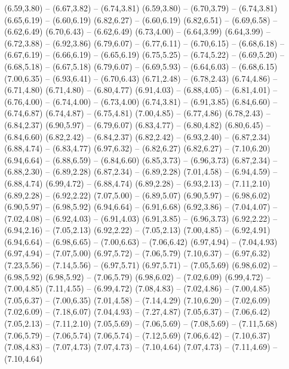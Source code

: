 {  (6.59,3.80) -- (6.67,3.82) -- (6.74,3.81)
  (6.59,3.80) -- (6.70,3.79) -- (6.74,3.81)
  (6.65,6.19) -- (6.60,6.19)
  (6.82,6.27) -- (6.60,6.19)
  (6.82,6.51) -- (6.69,6.58) -- (6.62,6.49)
  (6.70,6.43) -- (6.62,6.49)
  (6.73,4.00) -- (6.64,3.99)
  (6.64,3.99) -- (6.72,3.88) -- (6.92,3.86)
  (6.79,6.07) -- (6.77,6.11) -- (6.70,6.15) -- (6.68,6.18) -- (6.67,6.19) -- (6.66,6.19) -- (6.65,6.19)
  (6.75,5.25) -- (6.74,5.22) -- (6.69,5.20) -- (6.68,5.18) -- (6.67,5.18)
  (6.79,6.07) -- (6.69,5.93) -- (6.64,6.03) -- (6.68,6.15)
  (7.00,6.35) -- (6.93,6.41) -- (6.70,6.43)
  (6.71,2.48) -- (6.78,2.43)
  (6.74,4.86) -- (6.71,4.80)
  (6.71,4.80) -- (6.80,4.77)
  (6.91,4.03) -- (6.88,4.05) -- (6.81,4.01) -- (6.76,4.00) -- (6.74,4.00) -- (6.73,4.00)
  (6.74,3.81) -- (6.91,3.85)
  (6.84,6.60) -- (6.74,6.87)
  (6.74,4.87) -- (6.75,4.81)
  (7.00,4.85) -- (6.77,4.86)
  (6.78,2.43) -- (6.84,2.37)
  (6.90,5.97) -- (6.79,6.07)
  (6.83,4.77) -- (6.80,4.82)
  (6.80,6.45) -- (6.84,6.60)
  (6.82,2.42) -- (6.84,2.37)
  (6.82,2.42) -- (6.93,2.40) -- (6.87,2.34)
  (6.88,4.74) -- (6.83,4.77)
  (6.97,6.32) -- (6.82,6.27)
  (6.82,6.27) -- (7.10,6.20)
  (6.94,6.64) -- (6.88,6.59) -- (6.84,6.60)
  (6.85,3.73) -- (6.96,3.73)
  (6.87,2.34) -- (6.88,2.30) -- (6.89,2.28)
  (6.87,2.34) -- (6.89,2.28)
  (7.01,4.58) -- (6.94,4.59) -- (6.88,4.74)
  (6.99,4.72) -- (6.88,4.74)
  (6.89,2.28) -- (6.93,2.13) -- (7.11,2.10)
  (6.89,2.28) -- (6.92,2.22)
  (7.07,5.00) -- (6.89,5.07)
  (6.90,5.97) -- (6.98,6.02)
  (6.90,5.97) -- (6.98,5.92)
  (6.94,6.64) -- (6.91,6.68)
  (6.92,3.86) -- (7.04,4.07) -- (7.02,4.08) -- (6.92,4.03) -- (6.91,4.03)
  (6.91,3.85) -- (6.96,3.73)
  (6.92,2.22) -- (6.94,2.16) -- (7.05,2.13)
  (6.92,2.22) -- (7.05,2.13)
  (7.00,4.85) -- (6.92,4.91)
  (6.94,6.64) -- (6.98,6.65) -- (7.00,6.63) -- (7.06,6.42)
  (6.97,4.94) -- (7.04,4.93)
  (6.97,4.94) -- (7.07,5.00)
  (6.97,5.72) -- (7.06,5.79)
  (7.10,6.37) -- (6.97,6.32)
  (7.23,5.56) -- (7.14,5.56) -- (6.97,5.71)
  (6.97,5.71) -- (7.05,5.69)
  (6.98,6.02) -- (6.98,5.92)
  (6.98,5.92) -- (7.06,5.79)
  (6.98,6.02) -- (7.02,6.09)
  (6.99,4.72) -- (7.00,4.85)
  (7.11,4.55) -- (6.99,4.72)
  (7.08,4.83) -- (7.02,4.86) -- (7.00,4.85)
  (7.05,6.37) -- (7.00,6.35)
  (7.01,4.58) -- (7.14,4.29)
  (7.10,6.20) -- (7.02,6.09)
  (7.02,6.09) -- (7.18,6.07)
  (7.04,4.93) -- (7.27,4.87)
  (7.05,6.37) -- (7.06,6.42)
  (7.05,2.13) -- (7.11,2.10)
  (7.05,5.69) -- (7.06,5.69) -- (7.08,5.69) -- (7.11,5.68)
  (7.06,5.79) -- (7.06,5.74)
  (7.06,5.74) -- (7.12,5.69)
  (7.06,6.42) -- (7.10,6.37)
  (7.08,4.83) -- (7.07,4.73)
  (7.07,4.73) -- (7.10,4.64)
  (7.07,4.73) -- (7.11,4.69) -- (7.10,4.64)
}
